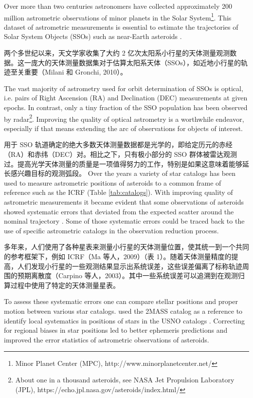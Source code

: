 \documentclass[review]{elsarticle}
\begin{document}
Over more than two centuries astronomers have collected approximately 200 million astrometric observations of minor planets in the Solar System\footnote{Minor Planet Center (MPC), http://www.minorplanetcenter.net/}.
This dataset %
of astrometric measurements is essential to estimate the trajectories of Solar System Objects (SSOs) such as near-Earth asteroids \citep{milani10}.

两个多世纪以来，天文学家收集了大约 2 亿次太阳系小行星的天体测量观测数据。这一庞大的天体测量数据集对于估算太阳系天体（SSOs），如近地小行星的轨迹至关重要（Milani 和 Gronchi, 2010）。

The vast majority of astrometry used for orbit determination of SSOs is optical, i.e. pairs of Right Ascension (RA) and Declination (DEC) measurements at given epochs. In contrast, only a tiny fraction of the SSO population has been observed by radar\footnote{About one in a thousand asteroids, see NASA Jet Propulsion Laboratory (JPL), https://echo.jpl.nasa.gov/asteroids/index.html/}. Improving the quality of optical astrometry is a worthwhile endeavor, especially if that means extending the arc of observations for objects of interest.  

用于 SSO 轨道确定的绝大多数天体测量数据都是光学的，即给定历元的赤经（RA）和赤纬（DEC）对。相比之下，只有极小部分的 SSO 群体被雷达观测过。提高光学天体测量的质量是一项值得努力的工作，特别是如果这意味着能够延长感兴趣目标的观测弧段。
%
Over the years a variety of star catalogs has been used to measure astrometric positions of asteroids to a common frame of reference such as the ICRF \citep{icrf2} (Table \ref{tab:catalogs}).
With improving quality of astrometric measurements it became evident that some observations of asteroids showed systematic errors that deviated from the expected scatter around the nominal trajectory \citep{carpino03}.  
Some of those systematic errors could be traced back to the use of specific astrometric catalogs in the observation reduction process. 

多年来，人们使用了各种星表来测量小行星的天体测量位置，使其统一到一个共同的参考框架下，例如 ICRF（Ma 等人，2009）（表 1）。随着天体测量精度的提高，人们发现小行星的一些观测结果显示出系统误差，这些误差偏离了标称轨迹周围的预期离散度（Carpino 等人，2003）。其中一些系统误差可以追溯到在观测归算过程中使用了特定的天体测量星表。

To assess these systematic errors one can compare stellar positions and proper motion between various star catalogs. 
\cite{chesley10} used the 2MASS \citep{2mass} catalog as a reference to identify local systematics in positions of stars in the USNO catalogs \citep{usnoa2,usnoa1,usnob1}. Correcting for regional biases in star positions led to better ephemeris predictions and improved the error statistics of astrometric observations of asteroids.
\end{document}
